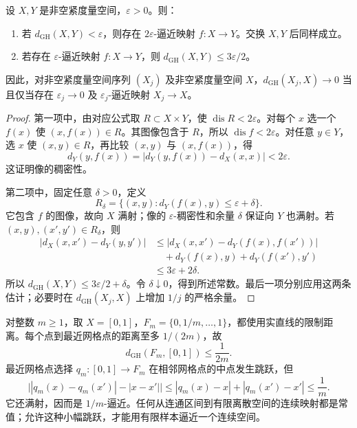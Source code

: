 \begin{proposition}\label{g3:prop:gh-approximation}
	设 \(X,Y\) 是非空紧度量空间，\(\varepsilon>0\)。则：
	\begin{enumerate}
		\item 若 \(d_{\mathrm{GH}}(X,Y)<\varepsilon\)，则存在 \(2\varepsilon\)-逼近映射 \(f:X\to Y\)。交换 \(X,Y\) 后同样成立。
		\item 若存在 \(\varepsilon\)-逼近映射 \(f:X\to Y\)，则 \(d_{\mathrm{GH}}(X,Y)\le3\varepsilon/2\)。
	\end{enumerate}
	因此，对非空紧度量空间序列 \((X_j)\) 及非空紧度量空间 \(X\)，\(d_{\mathrm{GH}}(X_j,X)\to0\) 当且仅当存在 \(\varepsilon_j\to0\) 及 \(\varepsilon_j\)-逼近映射 \(X_j\to X\)。
\end{proposition}
\begin{proof}
	第一项中，由对应公式取 \(R\subset X\times Y\)，使 \(\operatorname{dis}R<2\varepsilon\)。对每个 \(x\) 选一个 \(f(x)\) 使 \((x,f(x))\in R\)。其图像包含于 \(R\)，所以 \(\operatorname{dis}f<2\varepsilon\)。对任意 \(y\in Y\)，选 \(x\) 使 \((x,y)\in R\)，再比较 \((x,y)\) 与 \((x,f(x))\)，得
	\[
		d_Y(y,f(x))=|d_Y(y,f(x))-d_X(x,x)|<2\varepsilon.
	\]
	这证明像的稠密性。

	第二项中，固定任意 \(\delta>0\)，定义
	\[
		R_\delta=\{(x,y):d_Y(f(x),y)\le\varepsilon+\delta\}.
	\]
	它包含 \(f\) 的图像，故向 \(X\) 满射；像的 \(\varepsilon\)-稠密性和余量 \(\delta\) 保证向 \(Y\) 也满射。若 \((x,y),(x',y')\in R_\delta\)，则
	\[
	\begin{aligned}
		|d_X(x,x')-d_Y(y,y')|
		&\le |d_X(x,x')-d_Y(f(x),f(x'))|\\
		&\quad+d_Y(f(x),y)+d_Y(f(x'),y')\\
		&\le3\varepsilon+2\delta.
	\end{aligned}
	\]
	所以 \(d_{\mathrm{GH}}(X,Y)\le3\varepsilon/2+\delta\)。令 \(\delta\downarrow0\)，得到所述常数。最后一项分别应用这两条估计；必要时在 \(d_{\mathrm{GH}}(X_j,X)\) 上增加 \(1/j\) 的严格余量。
\end{proof}

\begin{example}\label{g3:exm:gh-finite-sampling}
	对整数 \(m\ge1\)，取 \(X=[0,1]\)，\(F_m=\{0,1/m,\ldots,1\}\)，都使用实直线的限制距离。每个点到最近网格点的距离至多 \(1/(2m)\)，故
	\[
		d_{\mathrm{GH}}(F_m,[0,1])\le\frac1{2m}.
	\]
	最近网格点选择 \(q_m:[0,1]\to F_m\) 在相邻网格点的中点发生跳跃，但
	\[
		\bigl||q_m(x)-q_m(x')|-|x-x'|\bigr|
		\le|q_m(x)-x|+|q_m(x')-x'|\le\frac1m.
	\]
	它还满射，因而是 \(1/m\)-逼近。任何从连通区间到有限离散空间的连续映射都是常值；允许这种小幅跳跃，才能用有限样本逼近一个连续空间。
\end{example}

